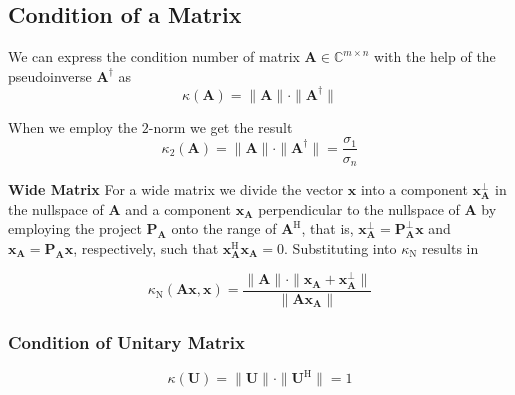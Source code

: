 \documentclass[english]{latex4ei/latex4ei_sheet}
\begin{document}
\begin{sectionbox}
\subsection{Condition of a Matrix}
We can express the condition number of matrix $\mathbf{A}\in\mathbb{C}^{m \times n}$ with the help of the pseudoinverse $\mathbf{A}^\dagger$ as 
$$\kappa(\mathbf{A}) = \parallel\mathbf{A}\parallel\cdot\parallel \mathbf{A}^\dagger\parallel$$

When we employ the $2$-norm we get the result
$$\kappa_2(\mathbf{A}) = \parallel\mathbf{A}\parallel\cdot\parallel \mathbf{A}^\dagger\parallel = \frac{\sigma_1}{\sigma_n}$$

\textbf{Wide Matrix}
For a wide matrix we divide the vector $\mathbf{x}$ into a component $\mathbf{x}^\perp_\mathbf{A}$ in the nullspace of $\mathbf{A}$ and a component $\mathbf{x}_\mathbf{A}$ perpendicular to the nullspace of $\mathbf{A}$ by employing the project $\mathbf{P}_\mathbf{A}$ onto the range of $\mathbf{A}^\text{H}$, that is, $\mathbf{x}^\perp_\mathbf{A} = \mathbf{P}^\perp_\mathbf{A}\mathbf{x}$ and $\mathbf{x}_\mathbf{A} = \mathbf{P}_\mathbf{A}\mathbf{x}$, respectively, such that $\mathbf{x}^\text{H}_\mathbf{A}\mathbf{x}_\mathbf{A} = 0$. Substituting into $\kappa_\text{N}$ results in

$$\kappa_\text{N}(\mathbf{A}\mathbf{x}, \mathbf{x}) = \frac{\parallel\mathbf{A}\parallel\cdot\parallel\mathbf{x}_\mathbf{A} + \mathbf{x}^\perp_\mathbf{A}\parallel}{\parallel\mathbf{A}\mathbf{x}_\mathbf{A}\parallel}$$

\subsubsection{Condition of Unitary Matrix}
$$\kappa(\mathbf{U}) = \parallel\mathbf{U}\parallel\cdot\parallel \mathbf{U}^\text{H}\parallel = 1$$
\end{sectionbox}
\end{document}
